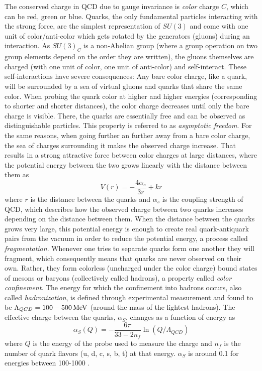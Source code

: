  The conserved charge in QCD due to gauge invariance is \emph{color} charge $C$, which can be red, green or blue. Quarks, the only fundamental particles interacting with the strong force, are the simplest representation of $SU(3)$ and come with one unit of color/anti-color which gets rotated by the generators (gluons) during an interaction. As $SU(3)_C$ is a non-Abelian group (where a group operation on two group elements depend on the order they are written), the gluons themselves are charged (with one unit of color, one unit of anti-color) and self-interact. These self-interactions have severe consequences: Any bare color charge, like a quark, will be surrounded by a sea of virtual gluons and quarks that share the same color. When probing the quark color at higher and higher energies (corresponding to shorter and shorter distances), the color charge decreases until only the bare charge is visible. There, the quarks are essentially free and can be observed as distinguishable particles. This property is referred to as \emph{asymptotic freedom}. For the same reasons, when going further an further away from a bare color charge, the sea of charges surrounding it makes the observed charge increase. That results in a strong attractive force between color charges at large distances, where the potential energy between the two grows linearly with the distance between them as
\begin{equation}
  V(r)=-\frac{4\alpha_s}{3r}+kr
\end{equation} 
where $r$ is the distance between the quarks and $\alpha_s$ is the coupling strength of QCD, which describes how the observed charge between two quarks increases depending on the distance between them. When the distance between the quarks grows very large, this potential energy is enough to create real quark-antiquark pairs from the vacuum in order to reduce the potential energy, a process called \emph{fragmentation}. Whenever one tries to separate quarks form one another they will fragment, which consequently means that quarks are never observed on their own. Rather, they form colorless (uncharged under the color charge) bound states of mesons or baryons (collectively called hadrons), a property called \emph{color confinement}. The energy for which the confinement into hadrons occurs, also called \emph{hadronization}, is defined through experimental measurement and found to be $\Lambda_{QCD}=100-500 \,\text{Me\hspace{-.08em}V}$ (around the mass of the lightest hadrons). The effective charge between the quarks, $\alpha_S$, changes as a function of energy as
 \begin{equation}
   \alpha_S(Q)=-\frac{6\pi}{33-2n_f}\ln(Q/\Lambda_{QCD})
 \end{equation}
where $Q$ is the energy of the probe used to measure the charge and $n_f$ is the number of quark flavors (u, d, c, s, b, t) at that energy. $\alpha_S$ is around 0.1 for energies between 100-1000 \GeV.

